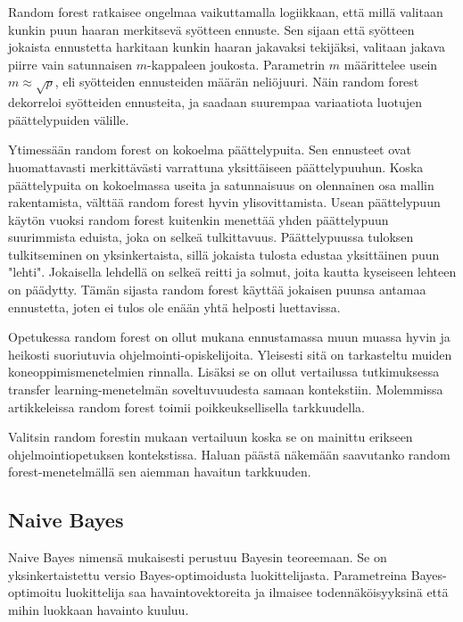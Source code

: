 \documentclass[finnish,twoside,openright]{HYgraduMLDS}
\begin{document}
Random forest ratkaisee ongelmaa vaikuttamalla logiikkaan, että millä valitaan kunkin puun haaran merkitsevä syötteen ennuste. Sen sijaan että syötteen jokaista ennustetta harkitaan kunkin haaran jakavaksi tekijäksi, valitaan jakava piirre vain satunnaisen $m$-kappaleen joukosta. Parametrin $m$ määrittelee usein $m \approx \sqrt{p}$, eli syötteiden ennusteiden määrän neliöjuuri. Näin random forest dekorreloi syötteiden ennusteita, ja saadaan suurempaa variaatiota luotujen päättelypuiden välille\cite{james2013ISLR}.

Ytimessään random forest on kokoelma päättelypuita. Sen ennusteet ovat huomattavasti merkittävästi varrattuna yksittäiseen päättelypuuhun\cite{james2013ISLR}. Koska päättelypuita on kokoelmassa useita ja satunnaisuus on olennainen osa mallin rakentamista, välttää random forest hyvin ylisovittamista\cite{james2013ISLR}. Usean päättelypuun käytön vuoksi random forest kuitenkin menettää yhden päättelypuun suurimmista eduista, joka on selkeä tulkittavuus\cite{james2013ISLR}. Päättelypuussa tuloksen tulkitseminen on yksinkertaista, sillä jokaista tulosta edustaa yksittäinen puun "lehti". Jokaisella lehdellä on selkeä reitti ja solmut, joita kautta kyseiseen lehteen on päädytty. Tämän sijasta random forest käyttää jokaisen puunsa antamaa ennustetta, joten ei tulos ole enään yhtä helposti luettavissa.

Opetukessa random forest on ollut mukana ennustamassa muun muassa hyvin ja heikosti suoriutuvia ohjelmointi-opiskelijoita. Yleisesti sitä on tarkasteltu muiden koneoppimismenetelmien rinnalla\cite{Ahadi:2015:EML:2787622.2787717}. Lisäksi se on ollut vertailussa tutkimuksessa transfer learning-menetelmän soveltuvuudesta samaan kontekstiin\cite{lagus2018transfer}. Molemmissa artikkeleissa random forest toimii poikkeuksellisella tarkkuudella.

Valitsin random forestin mukaan vertailuun koska se on mainittu erikseen ohjelmointiopetuksen kontekstissa. Haluan päästä näkemään saavutanko random forest-menetelmällä sen aiemman havaitun tarkkuuden.


\subsection{Naive Bayes}

Naive Bayes nimensä mukaisesti perustuu Bayesin teoreemaan. Se on yksinkertaistettu versio Bayes-optimoidusta luokittelijasta. Parametreina Bayes-optimoitu luokittelija saa havaintovektoreita ja ilmaisee todennäköisyyksinä että mihin luokkaan havainto kuuluu\cite{rish2001empirical}.
\end{document}
